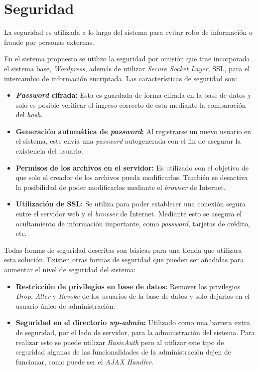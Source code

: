 \section{Seguridad}

La seguridad es utilizada a lo largo del sistema para evitar robo de información o 
fraude por personas externas. 

En el sistema propuesto se utilizo la seguridad por omisión que trae incorporada
el sistema base, \emph{Wordpress}, además de utilizar \emph{Secure Socket Layer}, SSL, para el
 intercambio de información encriptada. Las características de seguridad son:

\begin{itemize}

\item {\bf \emph{Password} cifrada:} Esta es guardada de forma cifrada en la base de datos y solo es 
	posible verificar el ingreso correcto de esta mediante la comparación del \emph{hash}.
\item {\bf Generación automática de \emph{password}:} Al registrarse un nuevo usuario en el sistema, este 
	envía una \emph{password} autogenerada con el fin de asegurar la existencia del usuario.
\item {\bf Permisos de los archivos en el servidor:} Es utilizado con el objetivo de que solo el creador
	de los archivos pueda modificarlos. También se desactiva la posibilidad de poder modificarlos
	mediante el \emph{browser} de Internet.
\item {\bf Utilización de SSL:} Se utiliza para poder establecer una conexión segura entre el servidor web
	y el \emph{browser} de Internet. Mediante esto se asegura el ocultamiento de información
	importante, como \emph{password}, tarjetas de crédito, etc. 
\end{itemize}  

Todas formas  de seguridad descritas son básicas para una tienda que utilizara esta solución. Existen 
otras formas de seguridad que pueden ser añadidas para aumentar el nivel de seguridad del sistema:

\begin{itemize}

\item {\bf Restricción de privilegios en base de datos:} Remover los privilegios \emph{Drop}, 
\emph{Alter} y \emph{Revoke} de los usuarios de la base de datos y solo dejarlos en el usuario
único de administración.

\item {\bf Seguridad en el directorio \emph{wp-admin}:} Utilizado como una barrera extra de seguridad,
por el lado de servidor, para la administración del sistema. Para realizar esto se puede utilizar 
\emph{BasicAuth} pero al utilizar este tipo de seguridad algunas de las funcionalidades de la 
administración dejen de funcionar, como puede ser el \emph{AJAX Handler}.

\end{itemize}

